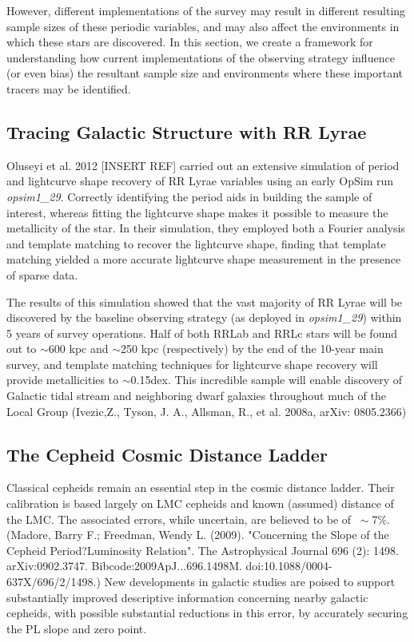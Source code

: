 However, different implementations of the survey may result in different resulting sample sizes of these periodic variables, and may also affect the environments in which these stars are discovered. In this section, we create a framework for understanding how current implementations of the observing strategy influence (or even bias) the resultant sample size and environments where these important tracers may be identified. 

\subsection{Tracing Galactic Structure with RR Lyrae}

Oluseyi et al. 2012 [INSERT REF] carried out an extensive simulation of period and lightcurve shape recovery of RR Lyrae variables using an early OpSim run \textit{opsim1_29}. Correctly identifying the period aids in building the sample of interest, whereas fitting the lightcurve shape makes it possible to measure the metallicity of the star. In their simulation, they employed both a Fourier analysis and template matching to recover the lightcurve shape, finding that template matching yielded a more accurate lightcurve shape measurement in the presence of sparse data. 

The results of this simulation showed that the vast majority of RR Lyrae will be discovered by the baseline observing strategy (as deployed in \textit{opsim1_29}) within 5 years of survey operations. Half of both RRLab and RRLc stars will be found out to $\sim$600 kpc and $\sim$250 kpc (respectively) by the end of the 10-year main survey, and template matching techniques for lightcurve shape recovery will provide metallicities to $\sim$0.15dex. This incredible sample will enable discovery of Galactic tidal stream and neighboring dwarf galaxies throughout much of the Local Group (Ivezic,Z., Tyson, J. A., Allsman, R., et al. 2008a, arXiv: 0805.2366) 


\subsection{The Cepheid Cosmic Distance Ladder}

Classical cepheids remain an essential step in the cosmic distance ladder. Their calibration is based largely on LMC cepheids and known (assumed) distance of the LMC.  The associated errors, while uncertain, are believed to be of $\>\sim$7\%. (Madore, Barry F.; Freedman, Wendy L. (2009). "Concerning the Slope of the Cepheid Period?Luminosity Relation". The Astrophysical Journal 696 (2): 1498. arXiv:0902.3747. Bibcode:2009ApJ...696.1498M. doi:10.1088/0004-637X/696/2/1498.) New developments in galactic studies are poised to support substantially improved descriptive information concerning nearby galactic cepheids, with possible substantial reductions in this error, by accurately securing the PL slope and zero point.

